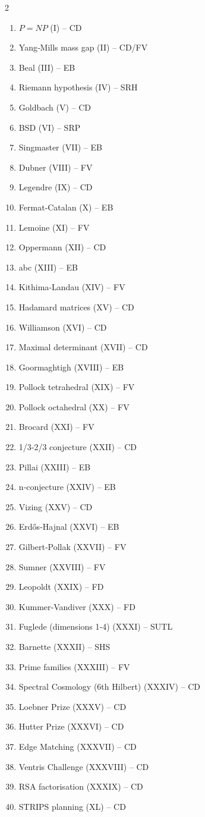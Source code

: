 \documentclass[11pt,a4paper]{article}
\begin{document}
\begin{multicols}{2}
\begin{enumerate}
\item \(P = NP\) (I) – CD
\item Yang‑Mills mass gap (II) – CD/FV
\item Beal (III) – EB
\item Riemann hypothesis (IV) – SRH
\item Goldbach (V) – CD
\item BSD (VI) – SRP
\item Singmaster (VII) – EB
\item Dubner (VIII) – FV
\item Legendre (IX) – CD
\item Fermat‑Catalan (X) – EB
\item Lemoine (XI) – FV
\item Oppermann (XII) – CD
\item abc (XIII) – EB
\item Kithima‑Landau (XIV) – FV
\item Hadamard matrices (XV) – CD
\item Williamson (XVI) – CD
\item Maximal determinant (XVII) – CD
\item Goormaghtigh (XVIII) – EB
\item Pollock tetrahedral (XIX) – FV
\item Pollock octahedral (XX) – FV
\item Brocard (XXI) – FV
\item 1/3‑2/3 conjecture (XXII) – CD
\item Pillai (XXIII) – EB
\item n‑conjecture (XXIV) – EB
\item Vizing (XXV) – CD
\item Erdős‑Hajnal (XXVI) – EB
\item Gilbert‑Pollak (XXVII) – FV
\item Sumner (XXVIII) – FV
\item Leopoldt (XXIX) – FD
\item Kummer‑Vandiver (XXX) – FD
\item Fuglede (dimensions 1‑4) (XXXI) – SUTL
\item Barnette (XXXII) – SHS
\item Prime families (XXXIII) – FV
\item Spectral Cosmology (6th Hilbert) (XXXIV) – CD
\item Loebner Prize (XXXV) – CD
\item Hutter Prize (XXXVI) – CD
\item Edge Matching (XXXVII) – CD
\item Ventris Challenge (XXXVIII) – CD
\item RSA factorisation (XXXIX) – CD
\item STRIPS planning (XL) – CD
\end{enumerate}
\end{multicols}
\end{document}
